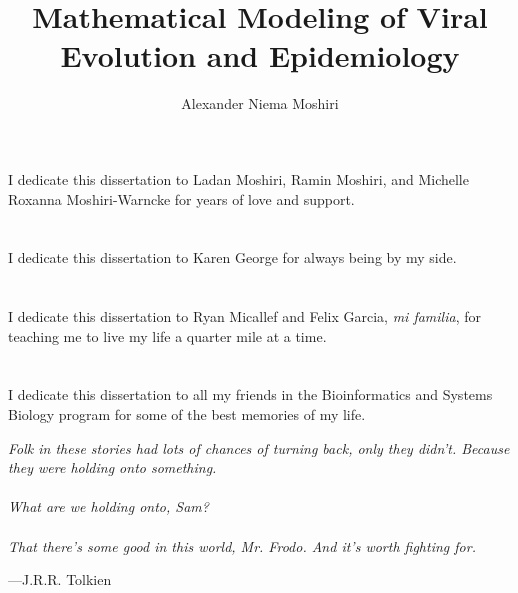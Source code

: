 \title{Mathematical Modeling of Viral Evolution and Epidemiology}
\author{Alexander Niema Moshiri}
\degreeyear{\the\year}



\begin{frontmatter}
\makefrontmatter

\begin{dedication}
\vspace*{\fill}
I dedicate this dissertation to Ladan Moshiri, Ramin Moshiri, and Michelle Roxanna Moshiri-Warncke for years of love and support.
~\\~\\~\\
I dedicate this dissertation to Karen George for always being by my side.
~\\~\\~\\
I dedicate this dissertation to Ryan Micallef and Felix Garcia, \textit{mi familia}, for teaching me to live my life a quarter mile at a time.
~\\~\\~\\
I dedicate this dissertation to all my friends in the Bioinformatics and Systems Biology program for some of the best memories of my life.
\vspace*{\fill}
\end{dedication}

\begin{epigraph}
\begin{center}
\begin{minipage}{0.65\linewidth}
\onehalfspacing
{\large
\textit{Folk in these stories had lots of chances of turning back, only they didn't. Because they were holding onto something.}\\
~\\
\textit{What are we holding onto, Sam?}\\
~\\
\textit{That there's some good in this world, Mr. Frodo. And it's worth fighting for.}
\begin{flushright}
---J.R.R. Tolkien
\end{flushright}
}
\end{minipage}
\end{center}
\end{epigraph}


\end{frontmatter}
